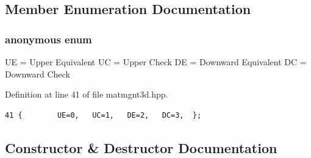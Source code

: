 \subsection{Member Enumeration Documentation}
\subsubsection{\setlength{\rightskip}{0pt plus 5cm}anonymous enum}\label{classMatMgnt3d_dca29a1140aadadfd92b34a02fa516ef_dca29a1140aadadfd92b34a02fa516ef}


UE = Upper Equivalent UC = Upper Check DE = Downward Equivalent DC = Downward Check \begin{Desc}
\item[Enumerator: ]\par
\begin{description}
\item[{\em 
UE\label{classMatMgnt3d_dca29a1140aadadfd92b34a02fa516ef_dca29a1140aadadfd92b34a02fa516ef0612e93d65abcdaeed533a0876474251}
}]\item[{\em 
UC\label{classMatMgnt3d_dca29a1140aadadfd92b34a02fa516ef_dca29a1140aadadfd92b34a02fa516ef6a2fb30a2dacdda4d74122697262a8b7}
}]\item[{\em 
DE\label{classMatMgnt3d_dca29a1140aadadfd92b34a02fa516ef_dca29a1140aadadfd92b34a02fa516ef3a52f3c22ed6fcde5bf696a6c02c9e73}
}]\item[{\em 
DC\label{classMatMgnt3d_dca29a1140aadadfd92b34a02fa516ef_dca29a1140aadadfd92b34a02fa516efcf75e54791dd1f49f918345fdfe2430b}
}]\end{description}
\end{Desc}



Definition at line 41 of file matmgnt3d.hpp.

\footnotesize\begin{verbatim}41 {        UE=0,   UC=1,   DE=2,   DC=3,  };
\end{verbatim}\normalsize 




\subsection{Constructor \& Destructor Documentation}
